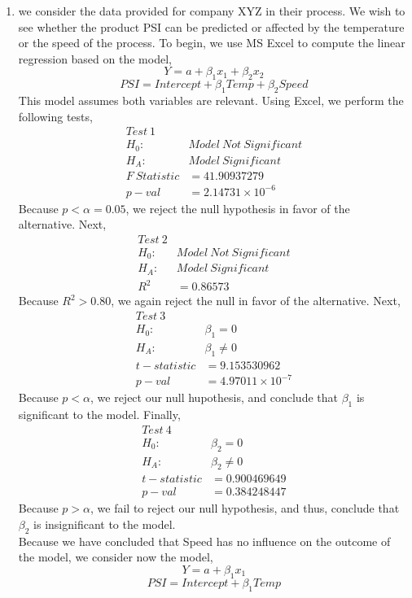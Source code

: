 \documentclass[letterpaper,10pt]{article}
\begin{document}
\begin{enumerate}
\item we consider the data provided for company XYZ in their process. We wish to see whether the product PSI can be predicted or affected by the temperature or the speed of the process. To begin, we use MS Excel to compute the linear regression based on the model,
\[Y=a+\beta_1 x_1+\beta_2 x_2\]
\[PSI=Intercept+\beta_1 Temp+\beta_2 Speed\]
This model assumes both variables are relevant. Using Excel, we perform the following tests,
\begin{align*}
Test\ 1 & \\
H_0: & Model\ Not\ Significant\\
H_A: & Model\ Significant\\
F\ Statistic &= 41.90937279\\
p-val &= 2.14731\times 10^{-6} 
\end{align*}
Because $p<\alpha=0.05$, we reject the null hypothesis in favor of the alternative. Next,
\begin{align*}
Test\ 2 & \\
H_0: & Model\ Not\ Significant\\
H_A: & Model\ Significant\\
R^2 &= 0.86573
\end{align*}
Because $R^2>0.80$, we again reject the null in favor of the alternative. Next,
\begin{align*}
Test\ 3 & \\
H_0: & \beta_1=0\\
H_A: & \beta_1\neq 0\\
t-statistic &= 9.153530962\\
p-val &= 4.97011\times 10^{-7} 
\end{align*}
Because $p<\alpha$, we reject our null hupothesis, and conclude that $\beta_1$ is significant to the model. Finally,
\begin{align*}
Test\ 4 & \\
H_0: & \beta_2=0\\
H_A: & \beta_2\neq 0\\
t-statistic &= 0.900469649\\
p-val &= 0.384248447 
\end{align*}
Because $p>\alpha$, we fail to reject our null hypothesis, and thus, conclude that $\beta_2$ is insignificant to the model.\\
Because we have concluded that Speed has no influence on the outcome of the model, we consider now the model,
\[Y=a+\beta_1 x_1\]
\[PSI=Intercept+\beta_1 Temp\]

\end{enumerate}
\end{document}
